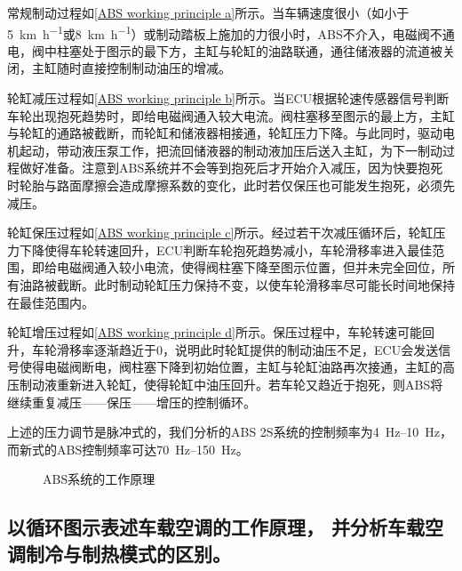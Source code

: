 \documentclass[UTF8]{ctexart}
\numberwithin{figure}{section}
\numberwithin{table}{section}
\begin{document}
常规制动过程如\cref{ABS working principle a}所示。当车辆速度很小（如小于\SI[per-mode = symbol]{5}{\km\per\hour}或\SI[per-mode = symbol]{8}{\km\per\hour}）或制动踏板上施加的力很小时，ABS不介入，电磁阀不通电，阀中柱塞处于图示的最下方，主缸与轮缸的油路联通，通往储液器的流道被关闭，主缸随时直接控制制动油压的增减。

轮缸减压过程如\cref{ABS working principle b}所示。当ECU根据轮速传感器信号判断车轮出现抱死趋势时，即给电磁阀通入较大电流。阀柱塞移至图示的最上方，主缸与轮缸的通路被截断，而轮缸和储液器相接通，轮缸压力下降。与此同时，驱动电机起动，带动液压泵工作，把流回储液器的制动液加压后送入主缸，为下一制动过程做好准备。注意到ABS系统并不会等到抱死后才开始介入减压，因为快要抱死时轮胎与路面摩擦会造成摩擦系数的变化，此时若仅保压也可能发生抱死，必须先减压。

轮缸保压过程如\cref{ABS working principle c}所示。经过若干次减压循环后，轮缸压力下降使得车轮转速回升，ECU判断车轮抱死趋势减小，车轮滑移率进入最佳范围，即给电磁阀通入较小电流，使得阀柱塞下降至图示位置，但并未完全回位，所有油路被截断。此时制动轮缸压力保持不变，以使车轮滑移率尽可能长时间地保持在最佳范围内。

轮缸增压过程如\cref{ABS working principle d}所示。保压过程中，车轮转速可能回升，车轮滑移率逐渐趋近于0，说明此时轮缸提供的制动油压不足，ECU会发送信号使得电磁阀断电，阀柱塞下降到初始位置，主缸与轮缸油路再次接通，主缸的高压制动液重新进入轮缸，使得轮缸中油压回升。若车轮又趋近于抱死，则ABS将继续重复减压——保压——增压的控制循环。

上述的压力调节是脉冲式的，我们分析的ABS 2S系统的控制频率为\qtyrange[range-phrase = $\,\sim\,$, range-units = single]{4}{10}{\Hz}，而新式的ABS控制频率可达\qtyrange[range-phrase = $\,\sim\,$, range-units = single]{70}{150}{\Hz}。

\begin{figure}[htbp]
	\centering
	\caption{ABS系统的工作原理}
	\label{ABS working principle}
\end{figure}

\subsection{以循环图示表述车载空调的工作原理， 并分析车载空调制冷与制热模式的区别。}
\end{document}
